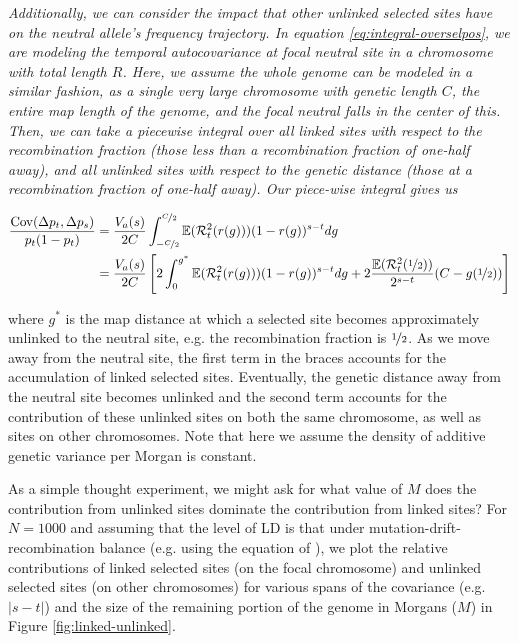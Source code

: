 \documentclass[11pt]{article}
\newcommand{\vb}[1]{{\it \color{blue} #1}}
\newcommand{\E}{\mathbb{E}}
\DeclareMathOperator{\cov}{Cov}
\begin{document}
\vb{Additionally, we can consider the impact that other unlinked selected
sites have on the neutral allele's frequency trajectory. In equation
\eqref{eq:integral-overselpos}, we are modeling the temporal autocovariance at
focal neutral site in a chromosome with total length $R$. Here, we assume the
whole genome can be modeled in a similar fashion, as a single very large
chromosome with genetic length $C$, the entire map length of the genome, and
the focal neutral falls in the center of this. Then, we can take a piecewise
integral over all linked sites with respect to the recombination fraction
(those less than a recombination fraction of one-half away), and all unlinked
sites with respect to the genetic distance (those at a recombination fraction
of one-half away). Our piece-wise integral gives us

  \begin{align}
    \frac{\cov(\Delta p_t, \Delta p_s)}{p_t(1-p_t) } &= \frac{V_a(s)}{2C} \int_{-\nicefrac{C}{2}}^{\nicefrac{C}{2}} \E(\mathcal{R}^2_{t}(r(g))) (1-r(g))^{s-t} d g \\
                                                     &= \frac{V_a(s)}{2C} \left[ 2 \int_{0}^{g^*} \E(\mathcal{R}^2_{t}(r(g))) (1-r(g))^{s-t} d g  + 2 \frac{\E(\mathcal{R}^2_{t}(\nicefrac{1}{2}))}{2^{s-t}} (C - g(\nicefrac{1}{2})) \right]  \label{eq:rel-contributions}
  \end{align}

where $g^*$ is the map distance at which a selected site becomes
approximately unlinked to the neutral site, e.g. the recombination fraction
is $\nicefrac{1}{2}$. As we move away from the neutral site, the first term in
the braces accounts for the accumulation of linked selected sites. Eventually,
the genetic distance away from the neutral site becomes unlinked and the second
term accounts for the contribution of these unlinked sites on both the same
chromosome, as well as sites on other chromosomes. Note that here we assume the
density of additive genetic variance per Morgan is constant.

As a simple thought experiment, we might ask for what value of $M$ does
the contribution from unlinked sites dominate the contribution from linked
sites? For $N=1000$ and assuming that the level of LD is that under
mutation-drift-recombination balance (e.g. using the equation of
\citeauthor{Tomoko_Ohta1971-hb}), we plot the relative contributions of linked
selected sites (on the focal chromosome) and unlinked selected sites (on other
chromosomes) for various spans of the covariance (e.g.  $|s-t|$) and the size
of the remaining portion of the genome in Morgans ($M$) in Figure
\ref{fig:linked-unlinked}.

}
\end{document}
